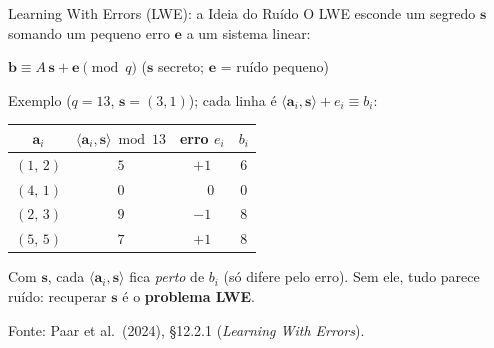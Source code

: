 \documentclass{beamer}
\begin{document}
\begin{frame}{Learning With Errors (LWE): a Ideia do Ruído}
    O LWE esconde um segredo $\mathbf{s}$ somando um pequeno erro $\mathbf{e}$ a um sistema linear:
    \begin{tcolorbox}[colback=gray!8,colframe=gray!60!black,boxrule=0.5pt]
        \centering\footnotesize
        $\mathbf{b} \equiv A\,\mathbf{s} + \mathbf{e} \pmod{q}$ \qquad ($\mathbf{s}$ secreto; $\mathbf{e}$ = ruído pequeno)
    \end{tcolorbox}
    \smallskip
    {\footnotesize Exemplo ($q = 13$, $\mathbf{s} = (3,1)$); cada linha é $\langle \mathbf{a}_i,\mathbf{s}\rangle + e_i \equiv b_i$:}
    \begin{center}
    \renewcommand{\arraystretch}{1.0}
    \scriptsize
    \begin{tabular}{c c c c}
        \toprule
        $\mathbf{a}_i$ & $\langle \mathbf{a}_i, \mathbf{s}\rangle \bmod 13$ & erro $e_i$ & $b_i$ \\
        \midrule
        $(1,\,2)$ & $5$ & $+1$ & $6$ \\
        $(4,\,1)$ & $0$ & $\phantom{+}0$ & $0$ \\
        $(2,\,3)$ & $9$ & $-1$ & $8$ \\
        $(5,\,5)$ & $7$ & $+1$ & $8$ \\
        \bottomrule
    \end{tabular}
    \end{center}
    \vspace{-0.3em}
    \begin{tcolorbox}[colback=blue!5,colframe=blue!50!black,boxrule=0.5pt]
        \footnotesize
        Com $\mathbf{s}$, cada $\langle \mathbf{a}_i,\mathbf{s}\rangle$ fica \emph{perto} de $b_i$ (só difere pelo erro). Sem ele, tudo parece ruído: recuperar $\mathbf{s}$ é o \textbf{problema LWE}.
    \end{tcolorbox}
    \smallskip
    {\tiny Fonte: Paar et al.\ (2024), §12.2.1 (\textit{Learning With Errors}).}
\end{frame}
\end{document}
